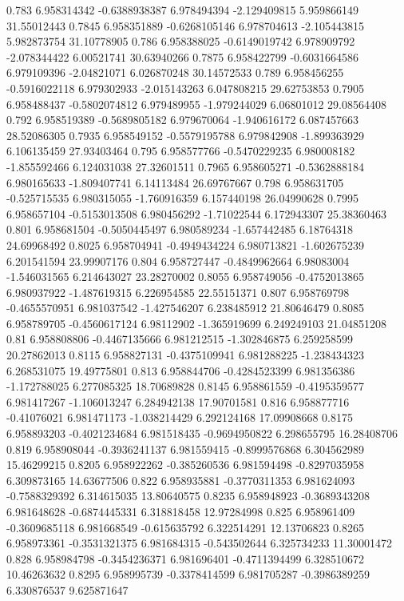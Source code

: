 {0.783 6.958314342 -0.6388938387 6.978494394 -2.129409815 5.959866149 31.55012443
0.7845 6.958351889 -0.6268105146 6.978704613 -2.105443815 5.982873754 31.10778905
0.786 6.958388025 -0.6149019742 6.978909792 -2.078344422 6.00521741 30.63940266
0.7875 6.958422799 -0.6031664586 6.979109396 -2.04821071 6.026870248 30.14572533
0.789 6.958456255 -0.5916022118 6.979302933 -2.015143263 6.047808215 29.62753853
0.7905 6.958488437 -0.5802074812 6.979489955 -1.979244029 6.06801012 29.08564408
0.792 6.958519389 -0.5689805182 6.979670064 -1.940616172 6.087457663 28.52086305
0.7935 6.958549152 -0.5579195788 6.979842908 -1.899363929 6.106135459 27.93403464
0.795 6.958577766 -0.5470229235 6.980008182 -1.855592466 6.124031038 27.32601511
0.7965 6.958605271 -0.5362888184 6.980165633 -1.809407741 6.14113484 26.69767667
0.798 6.958631705 -0.525715535 6.980315055 -1.760916359 6.157440198 26.04990628
0.7995 6.958657104 -0.5153013508 6.980456292 -1.71022544 6.172943307 25.38360463
0.801 6.958681504 -0.5050445497 6.980589234 -1.657442485 6.18764318 24.69968492
0.8025 6.958704941 -0.4949434224 6.980713821 -1.602675239 6.201541594 23.99907176
0.804 6.958727447 -0.4849962664 6.98083004 -1.546031565 6.214643027 23.28270002
0.8055 6.958749056 -0.4752013865 6.980937922 -1.487619315 6.226954585 22.55151371
0.807 6.958769798 -0.4655570951 6.981037542 -1.427546207 6.238485912 21.80646479
0.8085 6.958789705 -0.4560617124 6.98112902 -1.365919699 6.249249103 21.04851208
0.81 6.958808806 -0.4467135666 6.981212515 -1.302846875 6.259258599 20.27862013
0.8115 6.958827131 -0.4375109941 6.981288225 -1.238434323 6.268531075 19.49775801
0.813 6.958844706 -0.4284523399 6.981356386 -1.172788025 6.277085325 18.70689828
0.8145 6.958861559 -0.4195359577 6.981417267 -1.106013247 6.284942138 17.90701581
0.816 6.958877716 -0.41076021 6.981471173 -1.038214429 6.292124168 17.09908668
0.8175 6.958893203 -0.4021234684 6.981518435 -0.9694950822 6.298655795 16.28408706
0.819 6.958908044 -0.3936241137 6.981559415 -0.8999576868 6.304562989 15.46299215
0.8205 6.958922262 -0.385260536 6.981594498 -0.8297035958 6.309873165 14.63677506
0.822 6.958935881 -0.3770311353 6.981624093 -0.7588329392 6.314615035 13.80640575
0.8235 6.958948923 -0.3689343208 6.981648628 -0.6874445331 6.318818458 12.97284998
0.825 6.958961409 -0.3609685118 6.981668549 -0.615635792 6.322514291 12.13706823
0.8265 6.958973361 -0.3531321375 6.981684315 -0.543502644 6.325734233 11.30001472
0.828 6.958984798 -0.3454236371 6.981696401 -0.4711394499 6.328510672 10.46263632
0.8295 6.958995739 -0.3378414599 6.981705287 -0.3986389259 6.330876537 9.625871647
}
